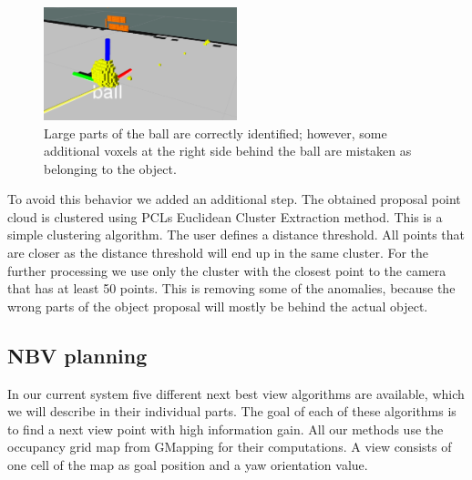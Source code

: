\documentclass[a4paper,11pt,english]{article}
\begin{document}
\begin{figure}[h!]
	\begin{center}
		\includegraphics[width=0.5\textwidth]{src/rays2.png}
		\caption{Large parts of the ball are correctly identified; however, some additional voxels at the right side behind the ball are mistaken as belonging to the object.}
		\label{fig:rays}
	\end{center}
\end{figure}

To avoid this behavior we added an additional step. 
The obtained proposal point cloud is clustered using PCLs Euclidean Cluster Extraction method.
This is a simple clustering algorithm.
The user defines a distance threshold.
All points that are closer as the distance threshold will end up in the same cluster.
For the further processing we use only the cluster with the closest point to the camera that has at least 50 points.
This is removing some of the anomalies, because the wrong parts of the object proposal will mostly be behind the actual object.




\subsection{NBV planning}
In our current system five different next best view algorithms are available, which we will describe in their individual parts.
The goal of each of these algorithms is to find a next view point with high information gain.
All our methods use the occupancy grid map from GMapping for their computations.
A view consists of one cell of the map as goal position and a yaw orientation value.
\end{document}

